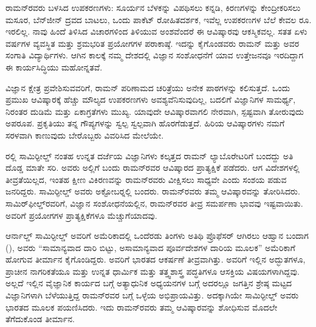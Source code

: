 ರಾಮನ್‍ರವರು ಬಳಸಿದ ಉಪಕರಣಗಳು: ಸೂರ್ಯನ ಬೆಳಕನ್ನು ವಿಪಥಿಸಲು ಕನ್ನಡಿ, ಕಿರಣಗಳನ್ನು ಕೇಂದ್ರೀಕರಿಸಲು ಮಸೂರ, ಬೆನ್‍ಜೀನ್ ದ್ರವದ ಬಾಟಲು, ಒಂದು ಪಾಕೆಟ್ ರೋಹಿತದರ್ಶಕ, ಇವೆಲ್ಲ ಉಪಕರಣಗಳ ಬೆಲೆ ಕೇವಲ ರೂ. ಇರಲಿಲ್ಲ. ನಾವು ಹಿಂದೆ ತಿಳಿಸಿದ ವಿಚಾರಗಳಿಂದ ತಿಳಿಯುವ ಅಂಶವೆಂದರೆ ಈ ಆವಿಷ್ಕಾರವು ಆಕಸ್ಮಿಕವಲ್ಲ. ಸತತ ಏಳು ವರ್ಷಗಳ ವ್ಯವಸ್ಥಿತ ಮತ್ತು ಶ್ರಮಭರಿತ ಪ್ರಯೋಗಗಳ ಪರಾಕಾಷ್ಠೆ. ಇದನ್ನು ಕೈಗೊಂಡವರು ರಾಮನ್ ಮತ್ತು ಅವರ ಸಂಗಾತಿ ವಿದ್ಯಾರ್ಥಿಗಳು. ಆಗಿನ ಕಾಲಕ್ಕೆ ನಮ್ಮ ದೇಶದಲ್ಲಿ ವಿಜ್ಞಾನ ಸಂಶೋಧನೆಗೆ ಯಾವ ಉತ್ತೇಜನವೂ ಇರದಿದ್ದಾಗ ಈ ಕಾರ್ಯಸಿದ್ಧಿಯು ಮಹೋನ್ನತವೆ.

ವಿಜ್ಞಾನ ಕ್ಷೇತ್ರ ಪ್ರವೇಶಿಸುವವರಿಗೆ, ರಾಮನ್ ಪರಿಣಾಮದ ಚರಿತ್ರೆಯು ಅನೇಕ ಪಾಠಗಳನ್ನು ಕಲಿಸುತ್ತದೆ. ಒಂದು ಪ್ರಮುಖ ಆವಿಷ್ಕಾರಕ್ಕೆ ಹೆಚ್ಚು ಮೌಲ್ಯದ ಉಪಕರಣಗಳು ಅವಶ್ಯವೆನಿಸುವುದಿಲ್ಲ, ಬದಲಿಗೆ ವಿಜ್ಞಾನಿಗಳ ಸಾಮರ್ಥ್ಯ, ನಿರಂತರ ದುಡಿಮೆ ಮತ್ತು ಏಕಾಗ್ರತೆಗಳು ಮುಖ್ಯ. ಯಾವುದೇ ಆವಿಷ್ಕಾರವಾಗಲಿ ನೇರವಾಗಿ, ಸ್ಪಷ್ಟವಾಗಿ ತೋರುವುದು ಅಪರೂಪ. ಪ್ರಕೃತಿಯು ತನ್ನ ಗೌಪ್ಯಗಳನ್ನು ಸ್ವಲ್ಪ ಸ್ವಲ್ಪವಾಗಿ ಹೊರಗೆಡುತ್ತದೆ. ಹಿರಿಯ ಆವಿಷ್ಕಾರಗಳು ನಮಗೆ ಸರಳವಾಗಿ ಕಾಣುವುದು ಬೇರೊಬ್ಬರು ವಿವರಿಸಿದ ಮೇಲೆಯೇ.



ರಲ್ಲಿ ಸಾಮಿರ್‍ಫೀಲ್ಡ್ ನಂತಹ ಉನ್ನತ ದರ್ಜೆಯ ವಿಜ್ಞಾನಿಗಳು ಕಲ್ಕತ್ತದ ರಾಮನ್ ಲ್ಯಾಬೊರೇಟರಿಗೆ ಬಂದದ್ದು ಅತಿ ದೊಡ್ಡ ಮಾತೇ ಸರಿ. ಅವರು ಅಲ್ಲಿಗೆ ಬಂದು ರಾಮನ್‍ರವರ ಆವಿಷ್ಕಾರದ ಪ್ರಾತ್ಯಕ್ಷಿಕೆ ಪಡೆದರು. ಆಗ ವಿದೇಶಗಳಲ್ಲಿ ತೀವ್ರತೆಯಿಲ್ಲದ, ಇಂತಹ ಕ್ಷೀಣ ವಿಕಿರಣವನ್ನು ರಾಮನ್‍ರವರು ವೀಕ್ಷಿಸಲು ಸಾಧ್ಯವೇ ಎಂದು ಸಂಶಯ ಪಡುವ ಜನರಿದ್ದರು. ಸಾಮಿರ್‍ಫೀಲ್ಡ್ ಅವರು  ಅಕ್ಟೋಬರ್‍ನಲ್ಲಿ ಬಂದರು. ರಾಮನ್‍ರವರು ತಮ್ಮ ಆವಿಷ್ಕಾರವನ್ನು ತೋರಿಸಿದರು. ಸಾಮಿರ್‌ಫೀಲ್ಡ್‌ರವರಿಗೆ, ವಿಜ್ಞಾನ ಸಂಶೋಧನೆಯಲ್ಲಿನ, ರಾಮನ್‍ರವರ ತೀವ್ರ ಸಮರ್ಪಣಾ ಭಾವವು ಇಷ್ಟವಾಯಿತು. ಅವರಿಗೆ ಪ್ರಯೋಗಗಳ ಪ್ರಾತ್ಯಕ್ಷಿಕೆಗಳೂ ಮೆಚ್ಚುಗೆಯಾದವು.

ಆರ್ನಾಲ್ಡ್ ಸಾಮಿರ್‍ಫೀಲ್ಡ್ ಅವರಿಗೆ ಅಮೆರಿಕಾದಲ್ಲಿ ಒಂದೆರಡು ತಿಂಗಳು ಅತಿಥಿ ಪ್ರೊಫೆಸರ್ ಆಗಿರಲು ಆಹ್ವಾನ ಬಂದಾಗ (), ಅವರು “ಸಾಮಾನ್ಯವಾದ ದಾರಿ ಬಿಟ್ಟು, ಅಸಾಮಾನ್ಯವಾದ ಪೂರ್ವದೇಶಗಳ ದಾರಿಯ ಮೂಲಕ” ಅಮೆರಿಕಾಗೆ ಹೋಗುವ ತೀರ್ಮಾನ ಕೈಗೊಂಡಿದ್ದರು. ಅವರಿಗೆ ಭಾರತದ ಆಕರ್ಷಣೆ ತೀವ್ರವಾಗಿತ್ತು. ಅವರಿಗೆ ಇಲ್ಲಿನ ಅದ್ಭುತಗಳೂ, ಪ್ರಾಚೀನ ನಾಗರಿಕತೆಯೂ ಮತ್ತು ಉನ್ನತ ಧಾರ್ಮಿಕ ಮತ್ತು ತತ್ತ್ವಶಾಸ್ತ್ರ ಪದ್ಧತಿಗಳೂ ಆಸಕ್ತಿಯ ವಿಷಯಗಳಾಗಿದ್ದವು. ಅಲ್ಲದೆ ಇಲ್ಲಿನ ವೈಜ್ಞಾನಿಕ ಕಾರ್ಯದ ಬಗ್ಗೆ ಅತ್ಯಾಧುನಿಕ ಅಧ್ಯಯನಗಳ ಬಗ್ಗೆ ಅದರಲ್ಲೂ ಜಗತ್ತಿನ ಶ್ರೇಷ್ಠ ಮಟ್ಟದ ವಿಜ್ಞಾನಿಗಳಾಗಿ ಬೆಳೆಯುತ್ತಿದ್ದ ರಾಮನ್‍ರವರ ಬಗ್ಗೆ ಒಳ್ಳೆಯ ಅಭಿಪ್ರಾಯವಿತ್ತು. ಅದಕ್ಕಾಗಿಯೇ ಸಾಮಿರ್‍ಫೀಲ್ಡ್ ಅವರು ಭಾರತದ ಮೂಲಕ ಪಯಣಿಸಿದರು. ಇದು ರಾಮನ್‍ರವರು ತಮ್ಮ ಆವಿಷ್ಕಾರವನ್ನು ಶೋಧಿಸುವ ಮೊದಲೇ ತೆಗೆದುಕೊಂಡ ತೀರ್ಮಾನ.

